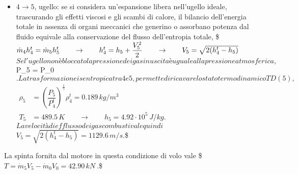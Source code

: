 \documentclass[letterpaper,10pt,italian]{jupyterBook}
\begin{document}
\begin{itemize}
\item {} 
\sphinxAtStartPar
\(4 \rightarrow 5\), ugello: se si considera un’espansione libera
nell’ugello ideale, trascurando gli effetti viscosi e gli scambi di
calore, il bilancio dell’energia totale in assenza di organi
meccanici che generino o assorbano potenza dal fluido equivale alla
conservazione del flusso dell’entropia totale,
\$\(\dot{m}_4 h_4^t = \dot{m}_5 h_5^t \qquad \rightarrow \qquad h_4^t = h_5 + \dfrac{V_5^2}{2} 
 \qquad \rightarrow \qquad V_5 = \sqrt{2(h_4^t - h_5)} \\\)\( Se
l'ugello non è bloccato la pressione dei gas in uscita è uguale alla
pressione atmosferica, \)P\_5 = P\_0\(. La trasformazione isentropica
tra 4 e 5, permette di ricavare lo stato termodinamico TD(5),
\)\(\begin{aligned}
  \rho_5 & = \left( \dfrac{P_5}{P_4^t} \right)^{\frac{1}{\gamma}} \rho_4^t = 0.189 \, kg/m^3 \\
     T_5 & = 489.5 \, K \qquad \rightarrow \qquad h_5 = 4.92 \cdot 10^5 \, J/kg .
\end{aligned}\)\( La velocità di efflusso dei gas combusti vale quindi
\)\(V_5 = \sqrt{2(h_4^t - h_5)} = 1129.6 \, m/s .\)\$

\end{itemize}

\sphinxAtStartPar
La spinta fornita dal motore in questa condizione di volo vale
\$\(T = \dot{m}_5 V_5 - \dot{m}_0 V_0 = 42.90 \, kN \ .\)\$

\sphinxstepscope
\end{document}
